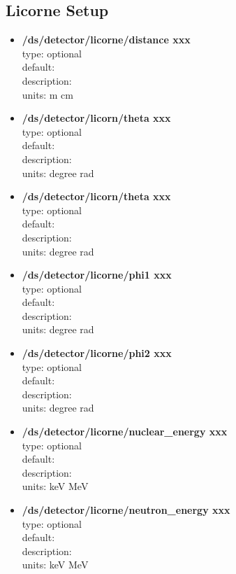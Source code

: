 \documentclass[twocolumn, 10pt]{article}
\begin{document}
\subsection{Licorne Setup}
\begin{itemize}
\item \textbf{ /ds/detector/licorne/distance  xxx}\\
type: optional \\
default: \\
description:  \\
units: m cm \\

\item \textbf{/ds/detector/licorn/theta   xxx}\\
type: optional \\
default: \\
description:  \\
units: degree rad \\

\item \textbf{/ds/detector/licorn/theta   xxx}\\
type: optional \\
default: \\
description:  \\
units: degree rad \\

\item \textbf{/ds/detector/licorne/phi1   xxx}\\
type: optional \\
default: \\
description:  \\
units: degree rad \\

\item \textbf{ /ds/detector/licorne/phi2  xxx}\\
type: optional \\
default: \\
description:  \\
units: degree rad \\

\item \textbf{/ds/detector/licorne/nuclear\_energy   xxx}\\
type: optional \\
default: \\
description:  \\
units: keV MeV \\

\item \textbf{/ds/detector/licorne/neutron\_energy   xxx}\\
type: optional \\
default: \\
description:  \\
units: keV MeV \\

\end{itemize}
\end{document}
